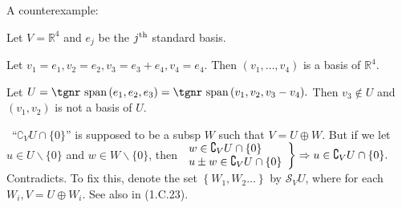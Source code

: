 \documentclass[a4paper, 11pt, UTF8]{article}
\def\Spn{{\textup{\tgnr span}}\,}
\def\Rbb{{\mathbb{R}}}
\def\BulletPoint{{\small\bullet}}
\begin{document}
\begin{large}


A counterexample:\par\quad
Let $V=\Rbb^4$ and $e_j$ be the $j^\TXT{th}$ standard basis.\par\quad
Let $v_1=e_1,v_2=e_2,v_3=e_3+e_4,v_4=e_4.$ Then $(v_1,\dots,v_4)$ is a basis of $\Rbb^4.$\par\quad
Let $U=\Spn(e_1,e_2,e_3)=\Spn(v_1,v_2,v_3-v_4).$ Then $v_3\not\in U$ and $(v_1,v_2)$ is not a basis of $U.$\PfEnd\SepLine

\BulletPoint \,\hspace{1pt}\TextB{}
$“\complement_V U \cap \{0\}”$ is supposed to be a subsp $W$ such that $V=U\oplus W$.\TextB{}
But if we let $u\in U\backslash\{0\}$ and $w\in W\backslash\{0\}$, then $\MathRightBrace{l}{w\in\complement_V U \cap \{0\}\\ u\pm w\in\complement_V U \cap \{0\} }\Rightarrow u\in\complement_V U \cap \{0\}.$ Contradicts.\vspace{4pt}\TextB{}
To fix this, {\Large denote the set $\left\{W_1,W_2\dots\right\}$ by $\mathcal{S}_V U$,} {\small where for each $W_i,V=U\oplus W_i$. See also in (1.C.23).}\par\SepLine


\end{large}
\end{document}
